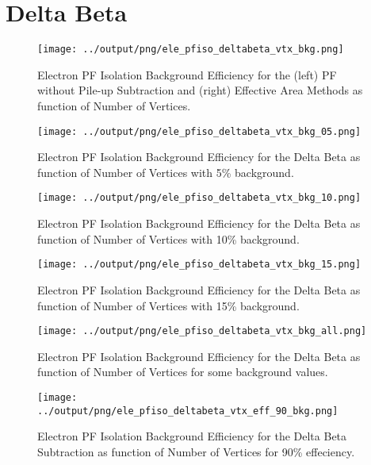 \documentclass[11pt]{book}
\begin{document}
\section{Delta Beta}
\begin{figure}[htb]
\centering
\texttt{[image: ../output/png/ele\_pfiso\_deltabeta\_vtx\_bkg.png]}
\caption{Electron PF Isolation Background Efficiency for the (left) PF without Pile-up Subtraction and (right) Effective Area Methods as function of Number of Vertices.}
\label{fig:ele_pfiso_vtx_bkg_deltabeta}
\end{figure}

\begin{figure}[htb]
\centering
\texttt{[image: ../output/png/ele\_pfiso\_deltabeta\_vtx\_bkg\_05.png]}
\caption{Electron PF Isolation Background Efficiency for the Delta Beta as function of Number of Vertices with 5\% background.}
\label{fig:ele_pfiso_vtx_bkg_deltabeta_bkg_05}
\end{figure}

\begin{figure}[htb]
\centering
\texttt{[image: ../output/png/ele\_pfiso\_deltabeta\_vtx\_bkg\_10.png]}
\caption{Electron PF Isolation Background Efficiency for the Delta Beta as function of Number of Vertices with 10\% background.}
\label{fig:ele_pfiso_vtx_bkg_deltabeta_bkg_10}
\end{figure}

\begin{figure}[htb]
\centering
\texttt{[image: ../output/png/ele\_pfiso\_deltabeta\_vtx\_bkg\_15.png]}
\caption{Electron PF Isolation Background Efficiency for the Delta Beta as function of Number of Vertices with 15\% background.}
\label{fig:ele_pfiso_vtx_bkg_deltabeta_bkg_15}
\end{figure}

\begin{figure}[htb]
\centering
\texttt{[image: ../output/png/ele\_pfiso\_deltabeta\_vtx\_bkg\_all.png]}
\caption{Electron PF Isolation Background Efficiency for the Delta Beta as function of Number of Vertices for some background values.}
\label{fig:ele_pfiso_vtx_bkg_deltabeta_bkg_all}
\end{figure}

\begin{figure}[htb]
\centering
\texttt{[image: ../output/png/ele\_pfiso\_deltabeta\_vtx\_eff\_90\_bkg.png]}
\caption{Electron PF Isolation Background Efficiency for the Delta Beta Subtraction as function of Number of Vertices for 90\% effeciency.}
\label{fig:ele_pfiso_vtx_eff_deltabeta_eff_90_bkg}
\end{figure}
\end{document}
